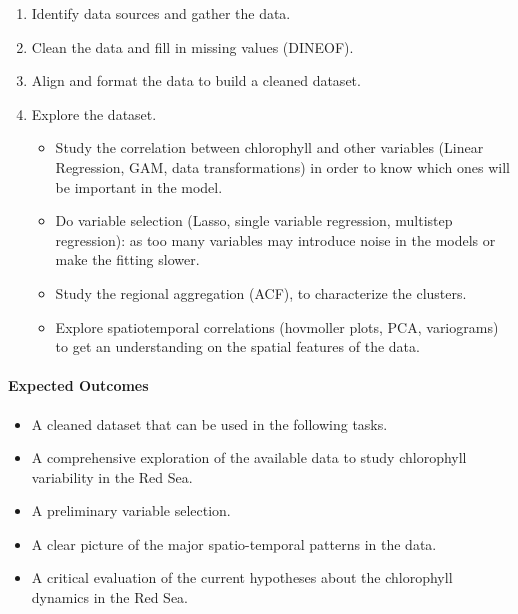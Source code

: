 \begin{enumerate} 

\item Identify data sources and gather the data.

\item Clean the data and fill in missing values (DINEOF).

\item Align and format the data to build a cleaned dataset.

\item Explore the dataset.

\begin{itemize} 

\item Study the correlation between chlorophyll and other variables (Linear
Regression, GAM, data transformations) in order to know which ones will
be important in the model.

\item Do variable selection (Lasso, single variable regression, multistep
regression): as too many variables may introduce noise in the models or make
the fitting slower.

\item Study the regional aggregation (ACF), to characterize the 
clusters.

\item Explore spatiotemporal correlations (hovmoller plots, PCA, variograms)
to get an understanding on the spatial features of the data.

\end{itemize}

\end{enumerate}

\paragraph{Expected Outcomes}

\begin{itemize} 

\item A cleaned dataset that can be used in the following tasks.

\item A comprehensive exploration of the available data to study chlorophyll
variability in the Red Sea.

\item A preliminary variable selection.

\item A clear picture of the major spatio-temporal patterns in the data.

\item A critical evaluation of the current hypotheses about the chlorophyll
dynamics in the Red Sea.

\end{itemize}
